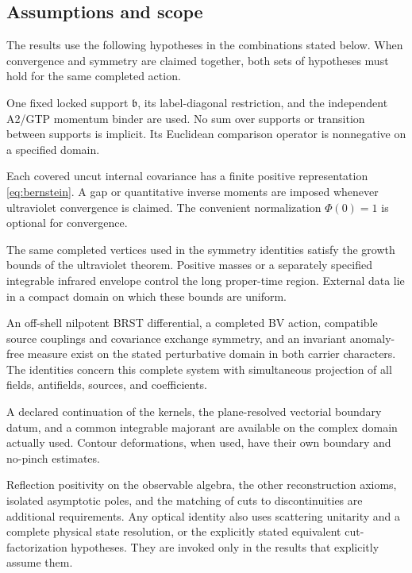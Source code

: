 \documentclass[final,5p,times,twocolumn,numbers,nopreprintline]{elsarticle}
\numberwithin{equation}{section}
\theoremstyle{definition}
\theoremstyle{remark}
\newcommand{\bb}{\mathfrak b}
\newcommand{\Ph}{\Phi}
\begin{document}
\subsection{Assumptions and scope}
\label{sec:assumptions}

The results use the following hypotheses in the combinations stated
below. When convergence and symmetry are claimed together, both sets
of hypotheses must hold for the same completed action.

\begin{description}[leftmargin=1.6cm,style=nextline]
\item[Geometry.]
One fixed locked support \(\bb\), its label-diagonal
restriction, and the independent A2/GTP momentum binder are used.
No sum over supports or transition between supports is implicit. Its Euclidean comparison
operator is nonnegative on a specified domain.

\item[Kernel.]
Each covered uncut internal covariance has a finite positive
representation \eqref{eq:bernstein}. A gap or quantitative inverse
moments are imposed whenever ultraviolet convergence is claimed.
The convenient normalization \(\Ph(0)=1\) is optional for convergence.

\item[Vertices and IR.]
The same completed vertices used in the symmetry identities satisfy
the growth bounds of the ultraviolet theorem. Positive masses or a
separately specified integrable infrared envelope control the long
proper-time region. External data lie in a compact domain on which
these bounds are uniform.

\item[Quantum symmetry.]
An off-shell nilpotent BRST differential, a completed BV action,
compatible source couplings and covariance exchange symmetry, and an
invariant anomaly-free measure
exist on the stated perturbative domain in both carrier characters.
The identities concern this complete system with simultaneous
projection of all fields, antifields, sources, and coefficients.

\item[Continuation.]
A declared continuation of the kernels, the plane-resolved
vectorial boundary datum, and a common integrable majorant are
available on the complex domain actually used.
Contour deformations, when used, have their own boundary and
no-pinch estimates.

\item[Physical completion.]
Reflection positivity on the observable algebra, the other
reconstruction axioms, isolated asymptotic poles, and the matching of
cuts to discontinuities are additional requirements. Any optical
identity also uses scattering unitarity and a complete physical state
resolution, or the explicitly stated equivalent cut-factorization
hypotheses. They are invoked
only in the results that explicitly assume them.
\end{description}
\end{document}
